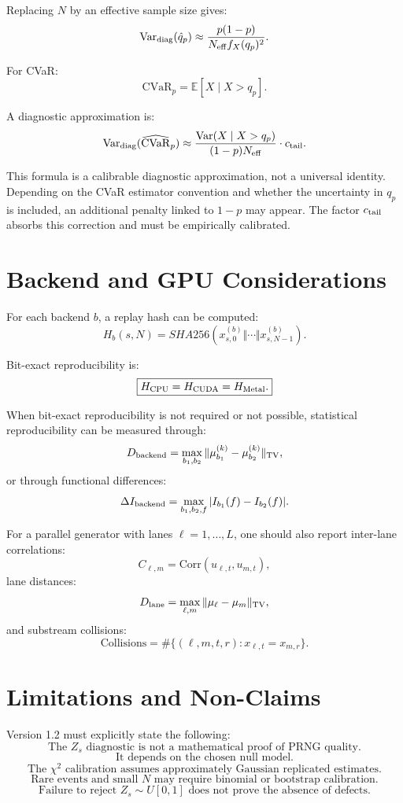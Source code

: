 \documentclass[11pt,a4paper]{article}
\newcommand{\E}{\mathbb E}
\newcommand{\Var}{\mathrm{Var}}
\newcommand{\Neff}{N_{\mathrm{eff}}}
\begin{document}
Replacing \(N\) by an effective sample size gives:
\[
\Var_{\rm diag}(\hat q_p)
\approx
\frac{p(1-p)}
{\Neff f_X(q_p)^2}.
\]

For CVaR:
\[
\mathrm{CVaR}_p
=
\E[X\mid X>q_p].
\]

A diagnostic approximation is:
\[
\Var_{\rm diag}(\widehat{\mathrm{CVaR}}_p)
\approx
\frac{
\Var(X\mid X>q_p)
}{
(1-p)\Neff
}
\cdot c_{\rm tail}.
\]

This formula is a calibrable diagnostic approximation, not a universal identity. Depending on the CVaR estimator convention and whether the uncertainty in \(q_p\) is included, an additional penalty linked to \(1-p\) may appear. The factor \(c_{\rm tail}\) absorbs this correction and must be empirically calibrated.

\section{Backend and GPU Considerations}

For each backend \(b\), a replay hash can be computed:
\[
H_b(s,N)
=
SHA256(x^{(b)}_{s,0}\Vert\cdots\Vert x^{(b)}_{s,N-1}).
\]

Bit-exact reproducibility is:
\[
\boxed{
H_{\rm CPU}=H_{\rm CUDA}=H_{\rm Metal}.
}
\]

When bit-exact reproducibility is not required or not possible, statistical reproducibility can be measured through:
\[
D_{\rm backend}
=
\max_{b_1,b_2}
\|\mu^{(k)}_{b_1}-\mu^{(k)}_{b_2}\|_{\rm TV},
\]
or through functional differences:
\[
\Delta I_{\rm backend}
=
\max_{b_1,b_2,f}
|I_{b_1}(f)-I_{b_2}(f)|.
\]

For a parallel generator with lanes \(\ell=1,\ldots,L\), one should also report inter-lane correlations:
\[
C_{\ell,m}
=
\mathrm{Corr}(u_{\ell,t},u_{m,t}),
\]
lane distances:
\[
D_{\rm lane}
=
\max_{\ell,m}
\|\mu_\ell-\mu_m\|_{\rm TV},
\]
and substream collisions:
\[
\mathrm{Collisions}
=
\#\{(\ell,m,t,r):x_{\ell,t}=x_{m,r}\}.
\]

\section{Limitations and Non-Claims}

Version 1.2 must explicitly state the following:
\[
\boxed{
\text{The }Z_s\text{ diagnostic is not a mathematical proof of PRNG quality.}
}
\]
\[
\boxed{
\text{It depends on the chosen null model.}
}
\]
\[
\boxed{
\text{The }\chi^2\text{ calibration assumes approximately Gaussian replicated estimates.}
}
\]
\[
\boxed{
\text{Rare events and small }N\text{ may require binomial or bootstrap calibration.}
}
\]
\[
\boxed{
\text{Failure to reject }Z_s\sim U[0,1]\text{ does not prove the absence of defects.}
}
\]
\end{document}
